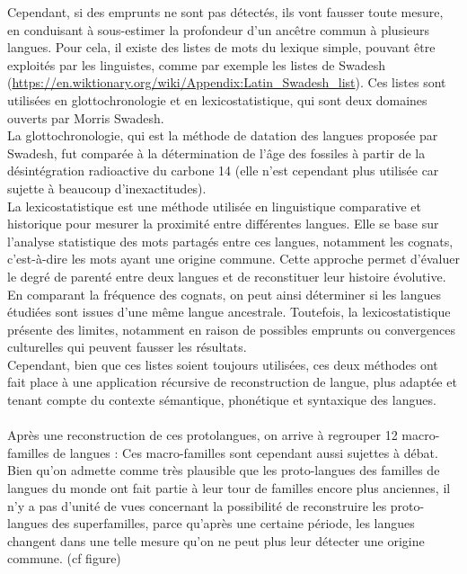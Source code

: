 \documentclass[12pt, french, twoside]{report}
\begin{document}
Cependant, si des emprunts ne sont pas détectés, ils vont fausser toute mesure, en conduisant à sous-estimer la profondeur d'un ancêtre commun à plusieurs langues. Pour cela, il existe des listes de mots du lexique simple, pouvant être exploités par les linguistes, comme par exemple les listes de Swadesh (\url{https://en.wiktionary.org/wiki/Appendix:Latin_Swadesh_list}). Ces listes sont utilisées en glottochronologie et en lexicostatistique, qui sont deux domaines ouverts par Morris Swadesh.\\

La glottochronologie, qui est la méthode de datation des langues proposée par Swadesh, fut comparée à la détermination de l'âge des fossiles à partir de la désintégration radioactive du carbone 14 (elle n'est cependant plus utilisée car sujette à beaucoup d'inexactitudes). \\
\indent La lexicostatistique est une méthode utilisée en linguistique comparative et historique pour mesurer la proximité entre différentes langues. Elle se base sur l'analyse statistique des mots partagés entre ces langues, notamment les cognats, c'est-à-dire les mots ayant une origine commune. Cette approche permet d'évaluer le degré de parenté entre deux langues et de reconstituer leur histoire évolutive. En comparant la fréquence des cognats, on peut ainsi déterminer si les langues étudiées sont issues d'une même langue ancestrale. Toutefois, la lexicostatistique présente des limites, notamment en raison de possibles emprunts ou convergences culturelles qui peuvent fausser les résultats.
\\ \indent Cependant, bien que ces listes soient toujours utilisées,  ces deux méthodes ont fait place à une application récursive de reconstruction de langue, plus adaptée et tenant compte du contexte sémantique, phonétique et syntaxique des langues.
\\ \\ 
\indent Après une reconstruction de ces protolangues, on arrive à regrouper 12 macro-familles de langues :  
Ces macro-familles sont cependant aussi sujettes à débat. Bien qu'on admette comme très plausible que les proto-langues des familles de langues du monde ont fait partie à leur tour de familles encore plus anciennes, il n'y a pas d'unité de vues concernant la possibilité de reconstruire les proto-langues des superfamilles, parce qu'après une certaine période, les langues changent dans une telle mesure qu'on ne peut plus leur détecter une origine commune. (cf figure) 
\end{document}
